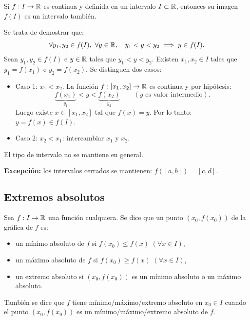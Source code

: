 \documentclass[11pt,a4paper]{article}
\begin{document}

\begin{corolario}
Si $f:I\to\mathbb{R}$ es continua y definida en un intervalo $I\subset\mathbb{R}$, entonces su imagen $f(I)$ es un intervalo también.
\end{corolario}

\begin{demo}
Se trata de demostrar que:
\[
  \forall y_1,y_2\in f(I),\ \forall y\in\mathbb{R},\quad y_1<y<y_2\implies y\in f(I).
\]
Sean $y_1,y_2\in f(I)$ e $y\in\mathbb{R}$ tales que $y_1<y<y_2$. Existen $x_1,x_2\in I$ tales que $y_1=f(x_1)$ e $y_2=f(x_2)$. Se distinguen dos casos:
\begin{itemize}
  \item Caso 1: $x_1<x_2$. La función $f:[x_1,x_2]\to\mathbb{R}$ es continua y por hipótesis:
  \[
    \underbrace{f(x_1)}_{y_1}<y<\underbrace{f(x_2)}_{y_2}\qquad(y \text{ es valor intermedio}).
  \]
  Luego existe $x\in[x_1,x_2]$ tal que $f(x)=y$. Por lo tanto: $y=f(x)\in f(I)$.
  \item Caso 2: $x_2<x_1$: intercambiar $x_1$ y $x_2$. \qedhere
\end{itemize}
\end{demo}

\begin{observacion}
El tipo de intervalo no se mantiene en general.
\end{observacion}

\textbf{Excepción:} los intervalos cerrados se mantienen: $f([a,b])=[c,d]$.

\subsection{Extremos absolutos}

\begin{definicion}
Sea $f:I\to\mathbb{R}$ una función cualquiera. Se dice que un punto $(x_0,f(x_0))$ de la gráfica de $f$ es:
\begin{itemize}
  \item un mínimo absoluto de $f$ si $f(x_0)\leq f(x)$ $(\forall x\in I)$,
  \item un máximo absoluto de $f$ si $f(x_0)\geq f(x)$ $(\forall x\in I)$,
  \item un extremo absoluto si $(x_0,f(x_0))$ es un mínimo absoluto o un máximo absoluto.
\end{itemize}
También se dice que $f$ tiene mínimo/máximo/extremo absoluto en $x_0\in I$ cuando el punto $(x_0,f(x_0))$ es un mínimo/máximo/extremo absoluto de $f$.
\end{definicion}
\end{document}

